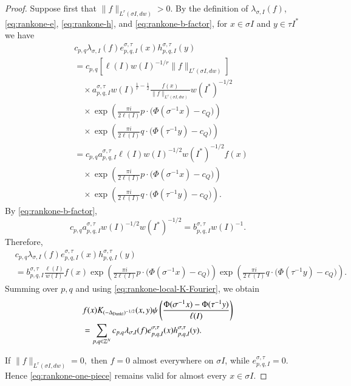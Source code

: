 \documentclass[12pt]{amsart}
\begin{document}
\begin{proof}
Suppose first that
$
\|f\|_{L^r(\sigma I,dw)}>0.
$
By the definition of $\lambda_{\sigma,I}(f)$,
\eqref{eq:rankone-e}, \eqref{eq:rankone-h}, and
\eqref{eq:rankone-b-factor}, for $x\in\sigma I$ and
$y\in\tau I^\ast$ we have
\begin{align*}
&c_{p,q}\lambda_{\sigma,I}(f)
e_{p,q,I}^{\sigma,\tau}(x)
h_{p,q,I}^{\sigma,\tau}(y)
\\
&=
c_{p,q}
\left[
\ell(I)w(I)^{-1/r}
\|f\|_{L^r(\sigma I,dw)}
\right]
\\
&\quad\times
a_{p,q,I}^{\sigma,\tau}
w(I)^{\frac1r-\frac12}
\frac{
f(x)
}{
\|f\|_{L^r(\sigma I,dw)}
}
w(I^\ast)^{-1/2}
\\
&\quad\times
\exp\left(
\frac{\pi i}{2\ell(I)}
p\cdot
\bigl(\Phi(\sigma^{-1}x)-c_Q\bigr)
\right)
\\
&\quad\times
\exp\left(
\frac{\pi i}{2\ell(I)}
q\cdot
\bigl(\Phi(\tau^{-1}y)-c_Q\bigr)
\right)
\\
&=
c_{p,q}a_{p,q,I}^{\sigma,\tau}
\ell(I)
w(I)^{-1/2}
w(I^\ast)^{-1/2}
f(x)
\\
&\quad\times
\exp\left(
\frac{\pi i}{2\ell(I)}
p\cdot
\bigl(\Phi(\sigma^{-1}x)-c_Q\bigr)
\right)
\\
&\quad\times
\exp\left(
\frac{\pi i}{2\ell(I)}
q\cdot
\bigl(\Phi(\tau^{-1}y)-c_Q\bigr)
\right).
\end{align*}
By \eqref{eq:rankone-b-factor},
\[
c_{p,q}a_{p,q,I}^{\sigma,\tau}
w(I)^{-1/2}w(I^\ast)^{-1/2}
=
b_{p,q,I}^{\sigma,\tau}w(I)^{-1}.
\]
Therefore,
\begin{align*}
&c_{p,q}\lambda_{\sigma,I}(f)
e_{p,q,I}^{\sigma,\tau}(x)
h_{p,q,I}^{\sigma,\tau}(y)\\
&=
b_{p,q,I}^{\sigma,\tau}
\frac{\ell(I)}{w(I)}
f(x)
\exp\left(
\frac{\pi i}{2\ell(I)}
p\cdot
\bigl(\Phi(\sigma^{-1}x)-c_Q\bigr)
\right)
\exp\left(
\frac{\pi i}{2\ell(I)}
q\cdot
\bigl(\Phi(\tau^{-1}y)-c_Q\bigr)
\right).
\end{align*}
Summing over $p,q$ and using
\eqref{eq:rankone-local-K-Fourier}, we obtain
\begin{align}
&f(x)K_{(-\Delta_{{\rm Dunkl}})^{-1/2}}(x,y)
\psi\left(
\frac{
\Phi(\sigma^{-1}x)-\Phi(\tau^{-1}y)
}{
\ell(I)
}
\right)
\nonumber\\
&=
\sum_{p,q\in\mathbb Z^N}
c_{p,q}
\lambda_{\sigma,I}(f)
e_{p,q,I}^{\sigma,\tau}(x)
h_{p,q,I}^{\sigma,\tau}(y).
\label{eq:rankone-one-piece}
\end{align}

If
$
\|f\|_{L^r(\sigma I,dw)}=0,
$
then $f=0$ almost everywhere on $\sigma I$, while
$e_{p,q,I}^{\sigma,\tau}=0$. Hence
\eqref{eq:rankone-one-piece} remains valid for almost every
$x\in\sigma I$.


\end{proof}
\end{document}
